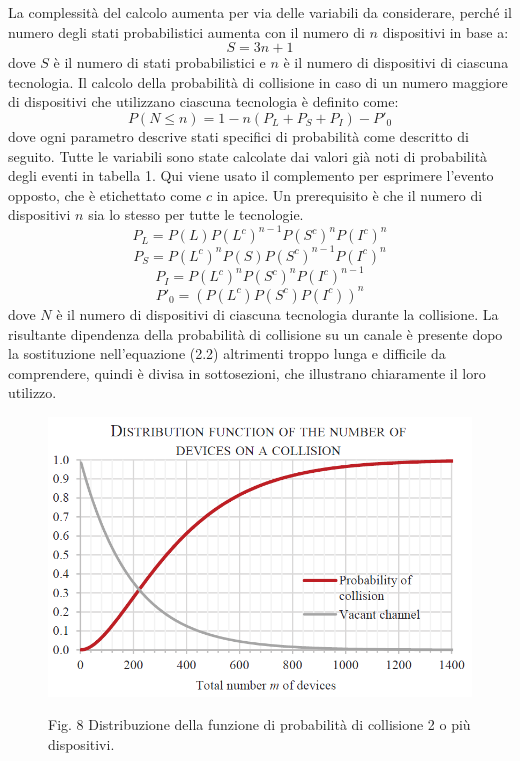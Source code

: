 \documentclass[a4paper]{report} %
\begin{document}
La complessità del calcolo aumenta per via delle variabili da considerare, perché il numero degli stati probabilistici aumenta con il numero di $n$ dispositivi in base a:
\begin{equation}
S = 3n + 1
\end{equation}
dove $S$ è il numero di stati probabilistici e $n$ è il numero di dispositivi di ciascuna tecnologia. Il calcolo della probabilità di collisione in caso di un numero maggiore di dispositivi che utilizzano ciascuna tecnologia è definito come:
\begin{equation}
P(N \leq n) = 1 - n(P_L + P_S + P_I) - P'_0
\end{equation}
dove ogni parametro descrive stati specifici di probabilità come descritto di seguito. Tutte le variabili sono state calcolate dai valori già noti di probabilità degli eventi in tabella 1. Qui viene usato il complemento per esprimere l'evento opposto, che è etichettato come $c$ in apice. Un prerequisito è che il numero di dispositivi $n$ sia lo stesso per tutte le tecnologie.
\begin{equation}
P_L = P(L)P(L^c)^{n-1}P(S^c)^nP(I^c)^n
\end{equation}
\begin{equation}
P_S = P(L^c)^nP(S)P(S^c)^{n-1}P(I^c)^n
\end{equation}
\begin{equation}
P_I = P(L^c)^nP(S^c)^nP(I^c)^{n-1}
\end{equation}
\begin{equation}
P'_0 = (P(L^c)P(S^c)P(I^c))^n
\end{equation}
dove $N$ è il numero di dispositivi di ciascuna tecnologia durante la collisione. La risultante dipendenza della probabilità di collisione su un canale è presente dopo la sostituzione nell'equazione (2.2) altrimenti troppo lunga e difficile da comprendere, quindi è divisa in sottosezioni, che illustrano chiaramente il loro utilizzo. %
\begin{figure}
\centering
\includegraphics[scale=.5]{Immagini/DistribuzioneDiProb.png}

Fig. 8 Distribuzione della funzione di probabilità di collisione 2 o più dispositivi.
\end{figure}
\end{document}
